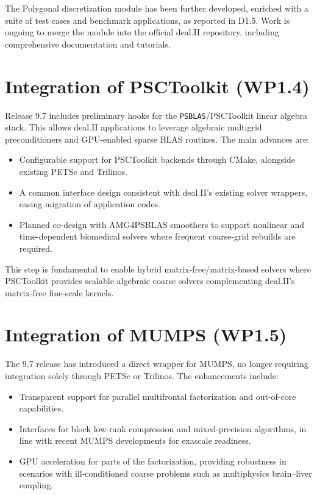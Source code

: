 \documentclass[a4paper,12pt]{article}
\begin{document}
The Polygonal discretization module has been further developed, enriched with a suite of test cases and benchmark applications, as reported in D1.5. Work is ongoing to merge the module into the official deal.II repository, including comprehensive documentation and tutorials.

\section{Integration of PSCToolkit (WP1.4)}

Release 9.7 includes preliminary hooks for the \texttt{PSBLAS}/PSCToolkit
linear algebra stack. This allows deal.II applications to leverage algebraic
multigrid preconditioners and GPU-enabled sparse BLAS routines. The main
advances are:

\begin{itemize}
  \item Configurable support for PSCToolkit backends through CMake, alongside
        existing PETSc and Trilinos.
  \item A common interface design consistent with deal.II’s existing solver
        wrappers, easing migration of application codes.
  \item Planned co-design with AMG4PSBLAS smoothers to support nonlinear and
        time-dependent biomedical solvers where frequent coarse-grid rebuilds
        are required.
\end{itemize}

This step is fundamental to enable hybrid matrix-free/matrix-based solvers
where PSCToolkit provides scalable algebraic coarse solvers complementing
deal.II’s matrix-free fine-scale kernels.

\section{Integration of MUMPS (WP1.5)}
\label{sec:section3}

The 9.7 release has introduced a direct wrapper for MUMPS, no longer requiring
integration solely through PETSc or Trilinos. The enhancements include:

\begin{itemize}
  \item Transparent support for parallel multifrontal factorization and
        out-of-core capabilities.
  \item Interfaces for block low-rank compression and mixed-precision
        algorithms, in line with recent MUMPS developments for exascale
        readiness.
  \item GPU acceleration for parts of the factorization, providing robustness in
        scenarios with ill-conditioned coarse problems such as multiphysics
        brain–liver coupling.
\end{itemize}
\end{document}
